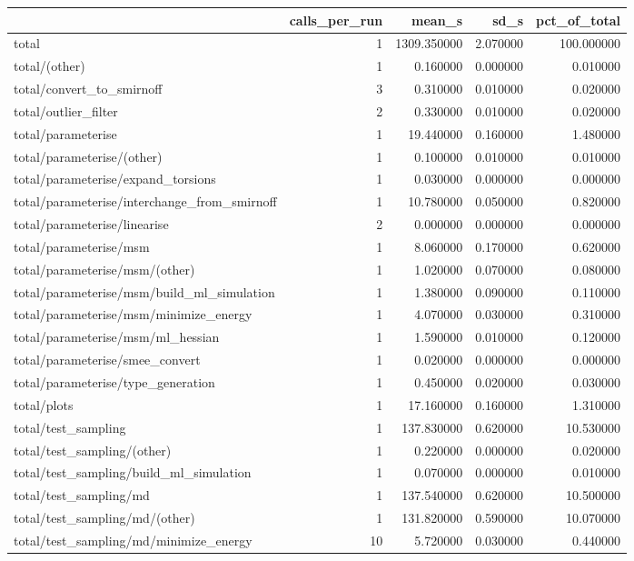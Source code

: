 \begin{tabular}{lrrrr}
\toprule
 & calls_per_run & mean_s & sd_s & pct_of_total \\
\midrule
total & 1 & 1309.350000 & 2.070000 & 100.000000 \\
total/(other) & 1 & 0.160000 & 0.000000 & 0.010000 \\
total/convert_to_smirnoff & 3 & 0.310000 & 0.010000 & 0.020000 \\
total/outlier_filter & 2 & 0.330000 & 0.010000 & 0.020000 \\
total/parameterise & 1 & 19.440000 & 0.160000 & 1.480000 \\
total/parameterise/(other) & 1 & 0.100000 & 0.010000 & 0.010000 \\
total/parameterise/expand_torsions & 1 & 0.030000 & 0.000000 & 0.000000 \\
total/parameterise/interchange_from_smirnoff & 1 & 10.780000 & 0.050000 & 0.820000 \\
total/parameterise/linearise & 2 & 0.000000 & 0.000000 & 0.000000 \\
total/parameterise/msm & 1 & 8.060000 & 0.170000 & 0.620000 \\
total/parameterise/msm/(other) & 1 & 1.020000 & 0.070000 & 0.080000 \\
total/parameterise/msm/build_ml_simulation & 1 & 1.380000 & 0.090000 & 0.110000 \\
total/parameterise/msm/minimize_energy & 1 & 4.070000 & 0.030000 & 0.310000 \\
total/parameterise/msm/ml_hessian & 1 & 1.590000 & 0.010000 & 0.120000 \\
total/parameterise/smee_convert & 1 & 0.020000 & 0.000000 & 0.000000 \\
total/parameterise/type_generation & 1 & 0.450000 & 0.020000 & 0.030000 \\
total/plots & 1 & 17.160000 & 0.160000 & 1.310000 \\
total/test_sampling & 1 & 137.830000 & 0.620000 & 10.530000 \\
total/test_sampling/(other) & 1 & 0.220000 & 0.000000 & 0.020000 \\
total/test_sampling/build_ml_simulation & 1 & 0.070000 & 0.000000 & 0.010000 \\
total/test_sampling/md & 1 & 137.540000 & 0.620000 & 10.500000 \\
total/test_sampling/md/(other) & 1 & 131.820000 & 0.590000 & 10.070000 \\
total/test_sampling/md/minimize_energy & 10 & 5.720000 & 0.030000 & 0.440000 \\

\end{tabular}
